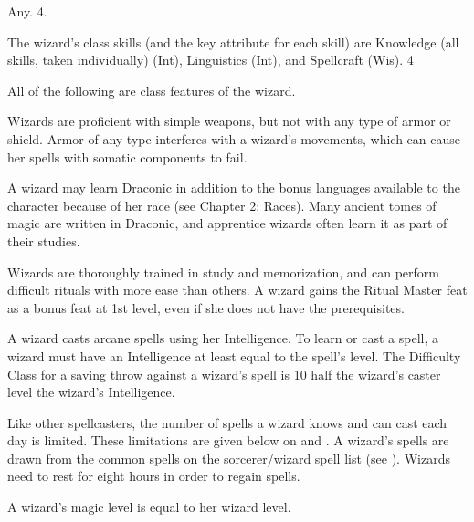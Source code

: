  Any.
 4.

The wizard's class skills (and the key attribute for each skill) are
Knowledge (all skills, taken individually) (Int), Linguistics (Int), and Spellcraft (Wis).
 4


All of the following are class features of the wizard.

 Wizards are proficient with simple weapons, but not with any type of armor or shield. Armor of any type interferes with a wizard's movements, which can cause her spells with somatic components to fail.

 A wizard may learn Draconic in addition to the bonus languages available to the character because of her race (see Chapter 2: Races). Many ancient tomes of magic are written in Draconic, and apprentice wizards often learn it as part of their studies.

 Wizards are thoroughly trained in study and memorization, and can perform difficult rituals with more ease than others. A wizard gains the Ritual Master feat as a bonus feat at 1st level, even if she does not have the prerequisites.

 A wizard casts arcane spells using her Intelligence. To learn or cast a spell, a wizard must have an Intelligence at least equal to the spell's level. The Difficulty Class for a saving throw against a wizard's spell is 10 \add half the wizard's caster level \add the wizard's Intelligence.

Like other spellcasters, the number of spells a wizard knows and can cast each day is limited. These limitations are given below on  and . A wizard's spells are drawn from the common spells on the sorcerer/wizard spell list (see ). Wizards need to rest for eight hours in order to regain spells. 

A wizard's magic level is equal to her wizard level.

